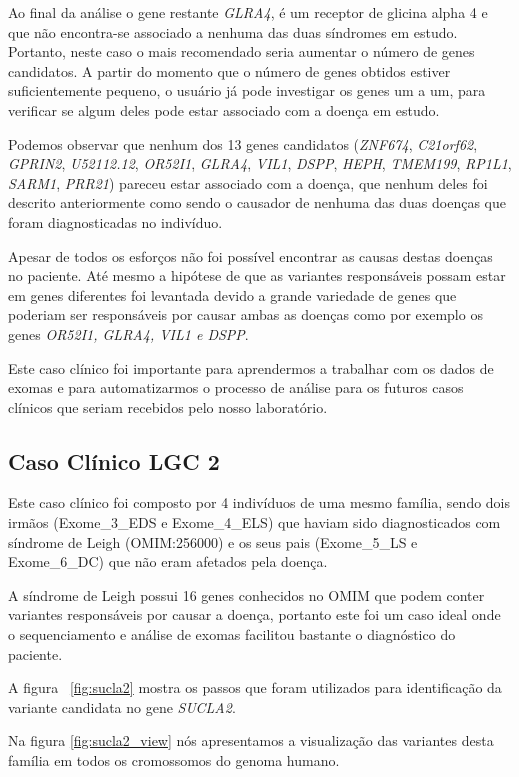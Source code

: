 Ao final da análise o gene restante \textit{GLRA4}, é um receptor de glicina alpha 4 e que não encontra-se associado a nenhuma das duas síndromes em estudo. Portanto, neste caso o mais recomendado seria aumentar o número de genes candidatos. A partir do momento que o número de genes obtidos estiver suficientemente pequeno, o usuário já pode investigar os genes um a um, para verificar se algum deles pode estar associado com a doença em estudo. 

Podemos observar que nenhum dos 13 genes candidatos (\textit{ZNF674}, \textit{C21orf62}, \textit{GPRIN2}, \textit{U52112.12}, \textit{OR52I1}, \textit{GLRA4}, \textit{VIL1}, \textit{DSPP}, \textit{HEPH}, \textit{TMEM199}, \textit{RP1L1}, \textit{SARM1}, \textit{PRR21}) pareceu estar associado com a doença, que nenhum deles foi descrito anteriormente como sendo o causador de nenhuma das duas doenças que foram diagnosticadas no indivíduo.

Apesar de todos os esforços não foi possível encontrar as causas destas doenças no paciente. Até mesmo a hipótese de que as variantes responsáveis possam estar em genes diferentes foi levantada devido a grande variedade de genes que poderiam ser responsáveis por causar ambas as doenças como por exemplo os genes \textit{OR52I1, GLRA4, VIL1 e DSPP}.

Este caso clínico foi importante para aprendermos a trabalhar com os dados de exomas e para automatizarmos o processo de análise para os futuros casos clínicos que seriam recebidos pelo nosso laboratório.

\subsection{Caso Clínico LGC 2}

Este caso clínico foi composto por 4 indivíduos de uma mesmo família, sendo dois irmãos (Exome\_3\_EDS e Exome\_4\_ELS) que haviam sido diagnosticados com síndrome de Leigh (OMIM:256000) e os seus pais (Exome\_5\_LS e Exome\_6\_DC) que não eram afetados pela doença.

A síndrome de Leigh possui 16 genes conhecidos no OMIM que podem conter variantes responsáveis por causar a doença, portanto este foi um caso ideal onde o sequenciamento e análise de exomas facilitou bastante o diagnóstico do paciente. 

A figura ~\ref{fig:sucla2} mostra os passos que foram utilizados para identificação da variante candidata no gene \textit{SUCLA2}.

Na figura \ref{fig:sucla2_view} nós apresentamos a visualização das variantes desta família em todos os cromossomos do genoma humano.

